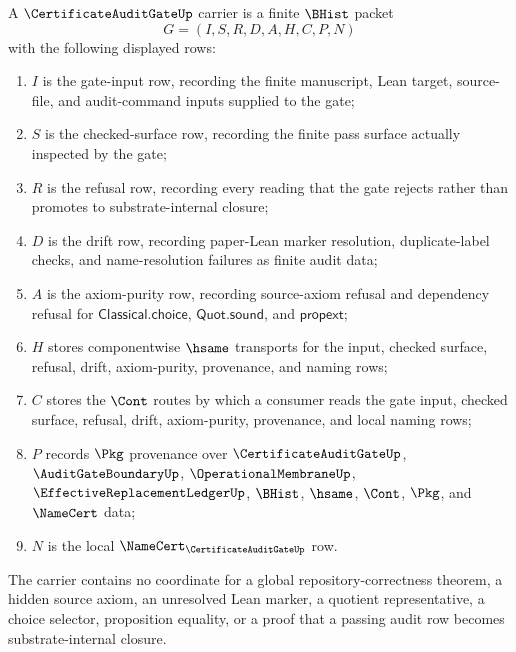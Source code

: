 \begin{definition}
\label{def:certificate-audit-gate-carrier}
A $\CertificateAuditGateUp$ carrier is a finite $\BHist$ packet
$$
G=(I,S,R,D,A,H,C,P,N)
$$
with the following displayed rows:
\begin{enumerate}
\item $I$ is the gate-input row, recording the finite manuscript, Lean target, source-file, and audit-command inputs supplied to the gate;
\item $S$ is the checked-surface row, recording the finite pass surface actually inspected by the gate;
\item $R$ is the refusal row, recording every reading that the gate rejects rather than promotes to substrate-internal closure;
\item $D$ is the drift row, recording paper-Lean marker resolution, duplicate-label checks, and name-resolution failures as finite audit data;
\item $A$ is the axiom-purity row, recording source-axiom refusal and dependency refusal for $\mathsf{Classical.choice}$, $\mathsf{Quot.sound}$, and $\mathsf{propext}$;
\item $H$ stores componentwise $\hsame$ transports for the input, checked surface, refusal, drift, axiom-purity, provenance, and naming rows;
\item $C$ stores the $\Cont$ routes by which a consumer reads the gate input, checked surface, refusal, drift, axiom-purity, provenance, and local naming rows;
\item $P$ records $\Pkg$ provenance over $\CertificateAuditGateUp$, $\AuditGateBoundaryUp$, $\OperationalMembraneUp$, $\EffectiveReplacementLedgerUp$, $\BHist$, $\hsame$, $\Cont$, $\Pkg$, and $\NameCert$ data;
\item $N$ is the local $\NameCert_{\CertificateAuditGateUp}$ row.
\end{enumerate}
The carrier contains no coordinate for a global repository-correctness theorem, a hidden source axiom, an unresolved Lean marker, a quotient representative, a choice selector, proposition equality, or a proof that a passing audit row becomes substrate-internal closure.
\end{definition}

